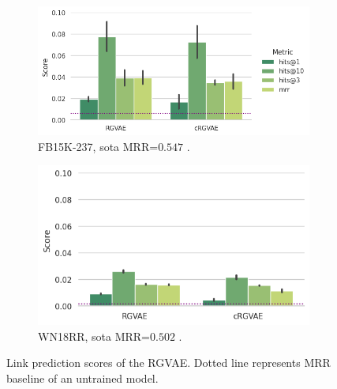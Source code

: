 

 \begin{figure}[H]
  \begin{subfigure}{.5\textwidth}
    \left
    \includegraphics[height=.5\textwidth, keepaspectratio]{graphs/plots/lp_fb.png}
    \caption{FB15K-237, sota MRR=$0.547$ \cite{pwcFB}.}
    \label{fig5:lpfb}
  \end{subfigure}%
  \begin{subfigure}{.5\textwidth}
    \right
    \includegraphics[height=.5\textwidth, keepaspectratio]{graphs/plots/lp_wn_wol.png}
    \caption{WN18RR, sota MRR=$0.502$ \cite{pwcWN}.}
    \label{fig5:lpwn}
  \end{subfigure}
  \caption{Link prediction scores of the RGVAE. Dotted line represents MRR baseline of an untrained model. }
  \label{fig5:lp_final}
\end{figure}


